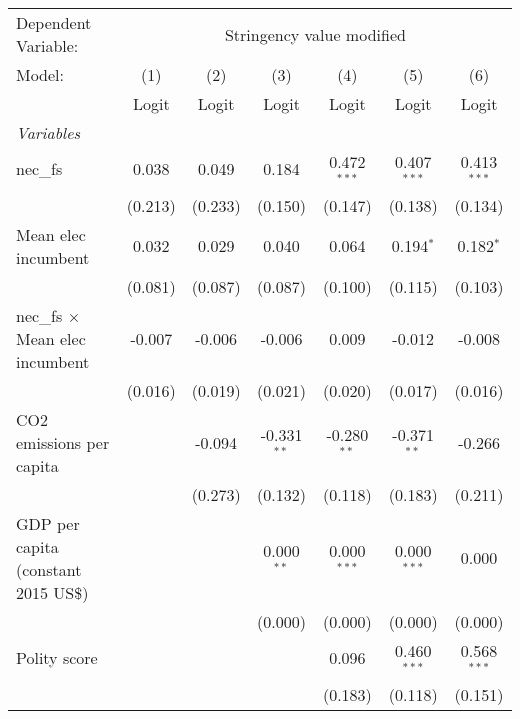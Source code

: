 
\begingroup
\centering
\begin{tabular}{lcccccc}
   \toprule
   Dependent Variable: & \multicolumn{6}{c}{Stringency value modified}\\
   Model:                                 & (1)     & (2)     & (3)           & (4)           & (5)           & (6)\\  
                                          &  Logit  & Logit   & Logit         & Logit         & Logit         & Logit\\  
   \midrule
   \emph{Variables}\\
   nec\_fs                                & 0.038   & 0.049   & 0.184         & 0.472$^{***}$ & 0.407$^{***}$ & 0.413$^{***}$\\   
                                          & (0.213) & (0.233) & (0.150)       & (0.147)       & (0.138)       & (0.134)\\   
   Mean elec incumbent                    & 0.032   & 0.029   & 0.040         & 0.064         & 0.194$^{*}$   & 0.182$^{*}$\\   
                                          & (0.081) & (0.087) & (0.087)       & (0.100)       & (0.115)       & (0.103)\\   
   nec\_fs $\times$ Mean elec incumbent   & -0.007  & -0.006  & -0.006        & 0.009         & -0.012        & -0.008\\   
                                          & (0.016) & (0.019) & (0.021)       & (0.020)       & (0.017)       & (0.016)\\   
   CO2 emissions per capita               &         & -0.094  & -0.331$^{**}$ & -0.280$^{**}$ & -0.371$^{**}$ & -0.266\\   
                                          &         & (0.273) & (0.132)       & (0.118)       & (0.183)       & (0.211)\\   
   GDP per capita (constant 2015 US\$)    &         &         & 0.000$^{**}$  & 0.000$^{***}$ & 0.000$^{***}$ & 0.000\\   
                                          &         &         & (0.000)       & (0.000)       & (0.000)       & (0.000)\\   
   Polity score                           &         &         &               & 0.096         & 0.460$^{***}$ & 0.568$^{***}$\\   
                                          &         &         &               & (0.183)       & (0.118)       & (0.151)\\   

\end{tabular}
